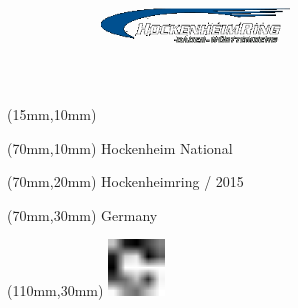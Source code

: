 \null\newpage
\begin{textblock*}{50mm}(15mm,10mm)%
\includegraphics[width=50mm]{LG/HOC.png}
\end{textblock*}
\begin{textblock*}{130mm}(70mm,10mm)%
{\fontsize{20}{20}\selectfont Hockenheim National}\\
\end{textblock*}
\begin{textblock*}{120mm}(70mm,20mm)%
{\fontsize{16}{16}\selectfont Hockenheimring / 2015}\\
\end{textblock*}
\begin{textblock*}{120mm}(70mm,30mm)%
{\fontsize{12}{12}\selectfont Germany}
\end{textblock*}
\begin{textblock*}{30mm}(110mm,30mm)%
\centering
\includegraphics[height=15mm]{icons/fa-rotate-right.pdf}
\end{textblock*}
